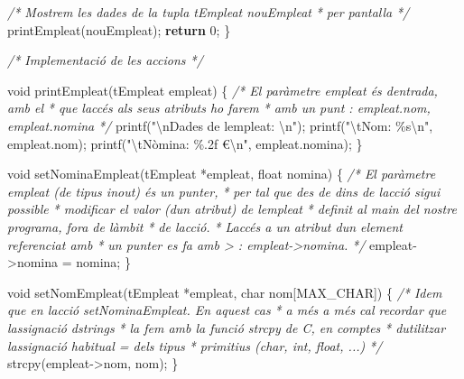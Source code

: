 \documentclass[
]{book}
\newenvironment{Shaded}{\begin{snugshade}}{\end{snugshade}}
\newcommand{\CommentTok}[1]{\textcolor[rgb]{0.56,0.35,0.01}{\textit{#1}}}
\newcommand{\ControlFlowTok}[1]{\textcolor[rgb]{0.13,0.29,0.53}{\textbf{#1}}}
\newcommand{\DataTypeTok}[1]{\textcolor[rgb]{0.13,0.29,0.53}{#1}}
\newcommand{\DecValTok}[1]{\textcolor[rgb]{0.00,0.00,0.81}{#1}}
\newcommand{\NormalTok}[1]{#1}
\newcommand{\SpecialCharTok}[1]{\textcolor[rgb]{0.00,0.00,0.00}{#1}}
\newcommand{\StringTok}[1]{\textcolor[rgb]{0.31,0.60,0.02}{#1}}
\begin{document}
\begin{Shaded}
\begin{Highlighting}[]
    \CommentTok{/* Mostrem les dades de la tupla tEmpleat nouEmpleat}
\CommentTok{     * per pantalla }
\CommentTok{     */}
\NormalTok{    printEmpleat(nouEmpleat);}
    \ControlFlowTok{return} \DecValTok{0}\NormalTok{;}
\NormalTok{\}}

\CommentTok{/* Implementació de les accions */}

\DataTypeTok{void}\NormalTok{ printEmpleat(tEmpleat empleat) \{}
    \CommentTok{/* El paràmetre empleat és d\textquotesingle{}entrada, amb el}
\CommentTok{     * que l\textquotesingle{}accés als seus atributs ho farem}
\CommentTok{     * amb un punt : empleat.nom, empleat.nomina }
\CommentTok{     */}
\NormalTok{    printf(}\StringTok{"}\SpecialCharTok{\textbackslash{}n}\StringTok{Dades de l\textquotesingle{}empleat: }\SpecialCharTok{\textbackslash{}n}\StringTok{"}\NormalTok{);}
\NormalTok{    printf(}\StringTok{"}\SpecialCharTok{\textbackslash{}t}\StringTok{Nom: \%s}\SpecialCharTok{\textbackslash{}n}\StringTok{"}\NormalTok{, empleat.nom);}
\NormalTok{    printf(}\StringTok{"}\SpecialCharTok{\textbackslash{}t}\StringTok{Nòmina: \%.2f €}\SpecialCharTok{\textbackslash{}n}\StringTok{"}\NormalTok{, empleat.nomina);}
\NormalTok{\}}

\DataTypeTok{void}\NormalTok{ setNominaEmpleat(tEmpleat *empleat, }\DataTypeTok{float}\NormalTok{ nomina) \{}
    \CommentTok{/* El paràmetre empleat (de tipus inout) és un punter,}
\CommentTok{     * per tal que des de dins de l\textquotesingle{}acció sigui possible}
\CommentTok{     * modificar el valor (d\textquotesingle{}un atribut) de l\textquotesingle{}empleat}
\CommentTok{     * definit al main del nostre programa, fora de l\textquotesingle{}àmbit}
\CommentTok{     * de l\textquotesingle{}acció.}
\CommentTok{     * L\textquotesingle{}accés a un atribut d\textquotesingle{}un element referenciat amb}
\CommentTok{     * un punter es fa amb \textquotesingle{}{-}\textgreater{}\textquotesingle{} : empleat{-}\textgreater{}nomina. }
\CommentTok{     */}
\NormalTok{    empleat{-}\textgreater{}nomina = nomina;}
\NormalTok{\}}

\DataTypeTok{void}\NormalTok{ setNomEmpleat(tEmpleat *empleat, }\DataTypeTok{char}\NormalTok{ nom[MAX\_CHAR]) \{}
    \CommentTok{/* Idem que en l\textquotesingle{}acció setNominaEmpleat. En aquest cas}
\CommentTok{     * a més a més cal recordar que l\textquotesingle{}assignació d\textquotesingle{}strings}
\CommentTok{     * la fem amb la funció strcpy de C, en comptes }
\CommentTok{     * d\textquotesingle{}utilitzar l\textquotesingle{}assignació habitual \textquotesingle{}=\textquotesingle{} dels tipus }
\CommentTok{     * primitius (char, int, float, ...) }
\CommentTok{     */}
\NormalTok{    strcpy(empleat{-}\textgreater{}nom, nom);}
\NormalTok{\}}
\end{Highlighting}
\end{Shaded}
\end{document}
